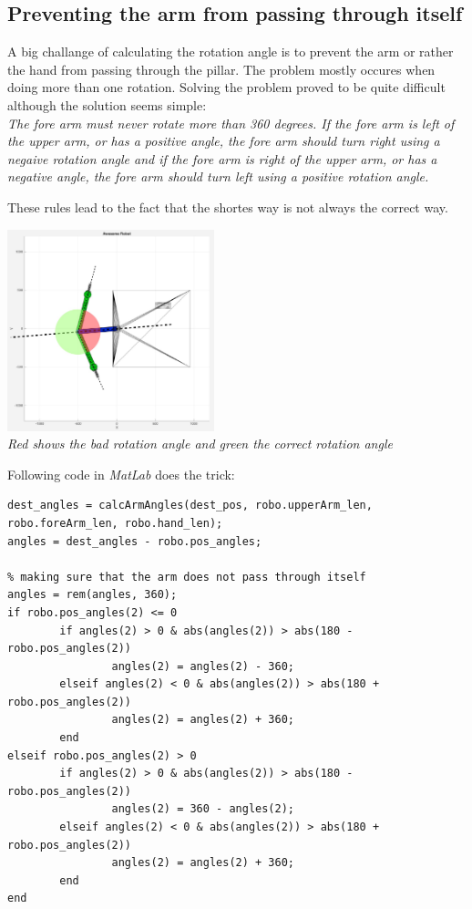 \subsection{Preventing the arm from passing through itself}
A big challange of calculating the rotation angle is to prevent the arm or rather the hand from passing through the pillar. The problem mostly occures when doing more than one rotation. Solving the problem proved to be quite difficult although the solution seems simple:\\

{\em The fore arm must never rotate more than 360 degrees. If the fore arm is left of the upper arm, or has a positive angle, the fore arm should turn right using a negaive rotation angle and if the fore arm is right of the upper arm, or has a negative angle, the fore arm should turn left using a positive rotation angle.}

These rules lead to the fact that the shortes way is not always the correct way.

\begin{center}
\includegraphics[width=0.45\textwidth]{imgs/AngleCalc/robot_passThroughProblem.jpg}\\
\textit{Red shows the bad rotation angle and green the correct rotation angle}
\end{center}

Following code in {\em MatLab} does the trick:

\begin{framed}\begin{verbatim}
dest_angles = calcArmAngles(dest_pos, robo.upperArm_len, robo.foreArm_len, robo.hand_len);
angles = dest_angles - robo.pos_angles;
    
% making sure that the arm does not pass through itself
angles = rem(angles, 360);
if robo.pos_angles(2) <= 0
        if angles(2) > 0 & abs(angles(2)) > abs(180 - robo.pos_angles(2))
                angles(2) = angles(2) - 360;
        elseif angles(2) < 0 & abs(angles(2)) > abs(180 + robo.pos_angles(2))
                angles(2) = angles(2) + 360;
        end
elseif robo.pos_angles(2) > 0
        if angles(2) > 0 & abs(angles(2)) > abs(180 - robo.pos_angles(2))
                angles(2) = 360 - angles(2);
        elseif angles(2) < 0 & abs(angles(2)) > abs(180 + robo.pos_angles(2))
                angles(2) = angles(2) + 360;
        end
end
\end{verbatim}\end{framed}

